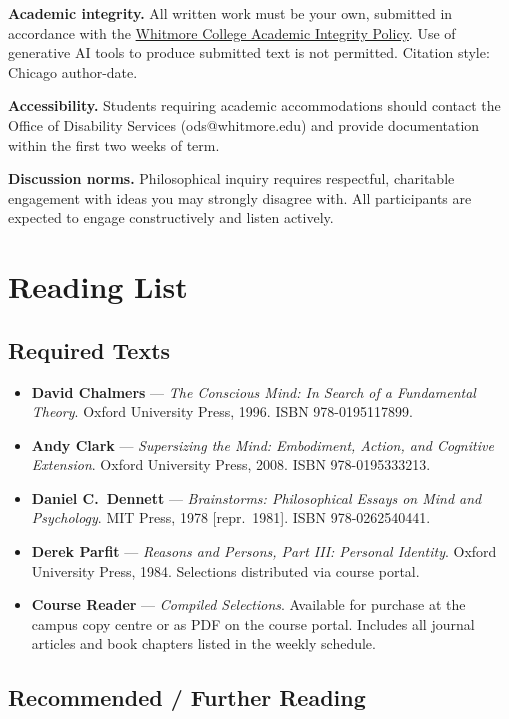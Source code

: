 \documentclass[11pt, a4paper]{article}
\newcommand{\reading}[3]{%
  \item \textbf{#1} — \textit{#2}. #3%
}
\begin{document}
\textbf{Academic integrity.}
All written work must be your own, submitted in accordance with the \href{https://whitmore.edu/integrity}{Whitmore College Academic Integrity Policy}.
Use of generative AI tools to produce submitted text is not permitted. Citation style:
Chicago author-date.

\textbf{Accessibility.}
Students requiring academic accommodations should contact the Office of Disability Services
(ods@whitmore.edu) and provide documentation within the first two weeks of term.

\textbf{Discussion norms.}
Philosophical inquiry requires respectful, charitable engagement with ideas you may strongly
disagree with. All participants are expected to engage constructively and listen actively.

\section{Reading List}

\subsection*{\color{accent}Required Texts}

\begin{itemize}[leftmargin=*, itemsep=3pt]
  \reading{David Chalmers}{The Conscious Mind: In Search of a Fundamental Theory}
          {Oxford University Press, 1996. ISBN 978-0195117899.}
  \reading{Andy Clark}{Supersizing the Mind: Embodiment, Action, and Cognitive Extension}
          {Oxford University Press, 2008. ISBN 978-0195333213.}
  \reading{Daniel C.\ Dennett}{Brainstorms: Philosophical Essays on Mind and Psychology}
          {MIT Press, 1978 [repr.\ 1981]. ISBN 978-0262540441.}
  \reading{Derek Parfit}{Reasons and Persons, Part III: Personal Identity}
          {Oxford University Press, 1984. Selections distributed via course portal.}
  \reading{Course Reader}{\textup{Compiled Selections}}{Available for purchase at the campus copy centre or as PDF on the course portal. Includes all journal articles and book chapters listed in the weekly schedule.}
\end{itemize}

\subsection*{\color{accent}Recommended / Further Reading}
\end{document}
